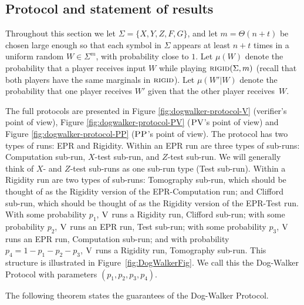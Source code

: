
\subsection{Protocol and statement of results}


Throughout this section we 
let $\Sigma=\{X,Y,Z,F,G\}$, and let $m=\Theta(n+t)$ be chosen 
large enough so that each symbol in $\Sigma$ appears at least $n+t$ times in a uniform random $W\in\Sigma^m$, with probability close to $1$.
Let $\mu({W})$ denote the probability that a player receives input ${W}$ while playing $\textsc{rigid}(\Sigma,m)$ (recall that both players have the same marginals in $\textsc{rigid}$). Let $\mu({W}'|{W})$ denote the probability that one player receives ${W}'$ given that the other player receives~${W}$. 

The full protocols are presented in Figure \ref{fig:dogwalker-protocol-V} (verifier's point of view), Figure \ref{fig:dogwalker-protocol-PV} ($\textsc{PV}$'s point of view) and Figure \ref{fig:dogwalker-protocol-PP} ($\textsc{PP}$'s point of view). The protocol has two 
types of runs: 
EPR and Rigidity. Within an EPR run are three 
types of sub-runs: 
Computation sub-run, $X$-test sub-run, and $Z$-test sub-run. We will generally think of $X$- and $Z$-test sub-runs as one sub-run type (Test sub-run). Within a Rigidity run are two types of sub-runs: Tomography sub-run, which should be thought of as the Rigidity version of the EPR-Computation run; and Clifford sub-run, which should be thought of as the Rigidity version of the EPR-Test run. With some probability $p_1$, $\textsc{V}$ runs a Rigidity run, Clifford sub-run; with some probability $p_2$, $\textsc{V}$ runs an EPR run, Test sub-run; with some probability $p_3$, $\textsc{V}$ runs an EPR run, Computation sub-run; and with probability $p_4=1-p_1-p_2-p_3$, $\textsc{V}$ runs a Rigidity run, Tomography sub-run. This structure is illustrated in Figure~\ref{fig:DogWalkerFig}. We call this the Dog-Walker Protocol with parameters $(p_1,p_2,p_3,p_4)$.



The following theorem states the guarantees of the Dog-Walker Protocol.

